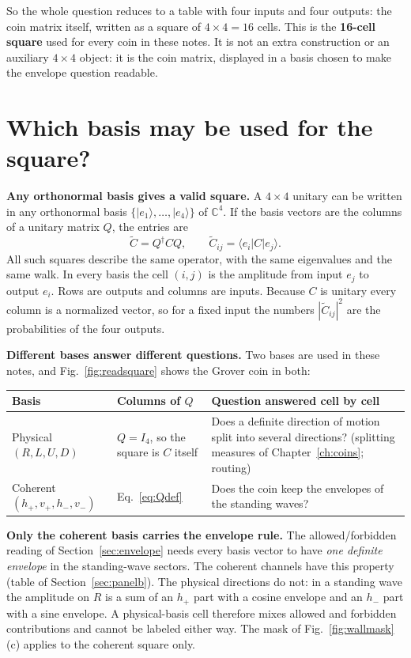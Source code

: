 \documentclass[11pt,a4paper,oneside]{report}
\newcommand{\ket}[1]{\lvert #1\rangle}
\newcommand{\bra}[1]{\langle #1\rvert}
\newcommand{\Id}{I}
\numberwithin{equation}{chapter}
\begin{document}
So the whole question reduces to a table with four inputs and four
outputs: the coin matrix itself, written as a square of
\(4\times4=16\) cells. This is the \textbf{16-cell square} used for every
coin in these notes. It is not an extra construction or an auxiliary
\(4\times4\) object: it is the coin matrix, displayed in a basis chosen to
make the envelope question readable.

\section{Which basis may be used for the square?}
\label{sec:square}

\textbf{Any orthonormal basis gives a valid square.} A \(4\times4\) unitary
can be written in any orthonormal basis \(\{\ket{e_1},\ldots,\ket{e_4}\}\)
of \(\mathbb C^4\). If the basis vectors are the columns of a unitary
matrix \(Q\), the entries are
\[
\widetilde C=Q^\dagger CQ,\qquad \widetilde C_{ij}=\bra{e_i}C\ket{e_j}.
\]
All such squares describe the same operator, with the same eigenvalues
and the same walk. In every basis the cell \((i,j)\) is the amplitude from
input \(e_j\) to output \(e_i\). Rows are outputs and columns are inputs.
Because \(C\) is unitary every column is a normalized vector, so for a
fixed input the numbers \(|\widetilde C_{ij}|^2\) are the probabilities of
the four outputs.

\textbf{Different bases answer different questions.} Two bases are used
in these notes, and Fig.~\ref{fig:readsquare} shows the Grover coin in
both:
\begin{center}\small
\begin{tabularx}{\textwidth}{@{}lYY@{}}\toprule
Basis & Columns of \(Q\) & Question answered cell by cell\\\midrule
Physical \((R,L,U,D)\) & \(Q=\Id_4\), so the square is \(C\) itself &
Does a definite direction of motion split into several directions?
(splitting measures of Chapter~\ref{ch:coins}; routing)\\
Coherent \((h_+,v_+,h_-,v_-)\) & Eq.~\eqref{eq:Qdef} &
Does the coin keep the envelopes of the standing waves?\\\bottomrule
\end{tabularx}
\end{center}

\textbf{Only the coherent basis carries the envelope rule.} The
allowed/forbidden reading of Section~\ref{sec:envelope} needs every basis
vector to have \emph{one definite envelope} in the standing-wave sectors.
The coherent channels have this property (table of
Section~\ref{sec:panelb}). The physical directions do not: in a
standing wave the amplitude on \(R\) is a sum of an \(h_+\) part with a
cosine envelope and an \(h_-\) part with a sine envelope. A physical-basis
cell therefore mixes allowed and forbidden contributions and cannot be
labeled either way. The mask of Fig.~\ref{fig:wallmask}(c) applies to the
coherent square only.
\end{document}

